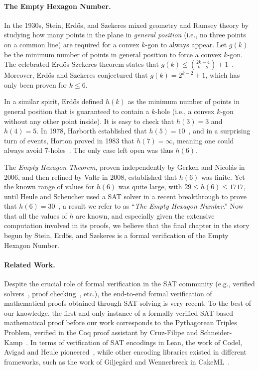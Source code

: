 \paragraph{The Empty Hexagon Number.}
In the 1930s, Stein, Erd\H{o}s, and Szekeres mixed geometry and Ramsey theory by studying how many points in the plane in \emph{general position} (i.e., no three points on a common line) are required for a convex $k$-gon to always appear. Let $g(k)$ be the minimum number of points in general position to force a convex $k$-gon.
The celebrated Erd\H{o}s-Szekeres theorem states that $g(k) \leq \binom{2k-4}{k-2} + 1$~\cite{erdosCombinatorialProblemGeometry2009}. Moreover, Erd\H{o}s and Szekeres conjectured that $g(k) = 2^{k-2} + 1$, which has only been proven for $k \leq 6$.

In a similar spirit, Erd\H{o}s defined $h(k)$ as the minimum number of points in general position that is guaranteed to contain a $k$-hole (i.e., a convex $k$-gon without any other point inside).
It is easy to check that $h(3) = 3$ and $h(4) = 5$. In 1978, Harborth established that $h(5) = 10$~\cite{Harborth1978}, and in a surprising turn of events, Horton proved in 1983 that $h(7) = \infty$, meaning one could always avoid $7$-holes~\cite{hortonSetsNoEmpty1983}. 
The only case left open was thus $h(6)$.

The \emph{Empty Hexagon Theorem}, proven independently by Gerken and Nicolás in 2006, and then refined by Valtr in 2008, established that $h(6)$ was finite.
Yet the known range of values for $h(6)$ was quite large, with $29 \leq h(6) \leq 1717$, until Heule and Scheucher used a SAT solver in a recent breakthrough to prove that $h(6) = 30$~\cite{emptyHexagonNumber}, a result we refer to as ``\emph{The Empty Hexagon Number}.''
Now that all the values of $h$ are known, and especially given the extensive computation involved in its proofs, we believe that the final chapter in the story begun by Stein, Erd\H{o}s, and Szekeres is a formal verification of the Empty Hexagon Number.

\paragraph{Related Work.} Despite the crucial role of formal verification in the SAT community (e.g., verified solvers~\cite{oeVersatVerifiedModern2012,skotam_creusat_2022}, proof checking~\cite{lammichEfficientVerifiedSAT2020,tanVerifiedPropagationRedundancy2023}, etc.), the end-to-end formal verification of mathematical proofs obtained through SAT-solving is very recent. To the best of our knowledge, the first and only instance of a formally verified SAT-based mathematical proof before our work corresponds to the Pythagorean Triples Problem, verified in the \textsf{Coq} proof assistant by Cruz-Filipe and Schneider-Kamp~\cite{formalPythagoreanTriples,LPAR-21:Formally_Proving_Boolean_Pythagorean}. In terms of verification of SAT encodings in Lean, the work of Codel, Avigad and Heule pioneered~\cite{Cayden}, while other encoding libraries existed in different frameworks, such as the work of Giljeg\r{a}rd and Wennerbreck in \textsf{CakeML}~\cite{GilAndWennerbeck}.

